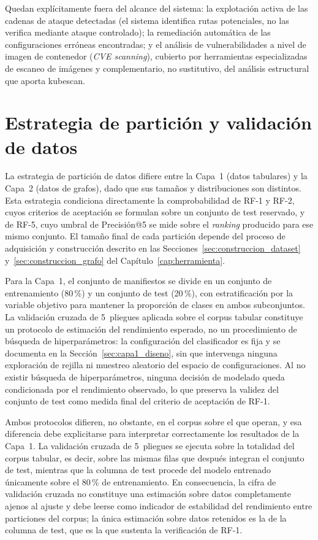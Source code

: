 Quedan explícitamente fuera del alcance del sistema: la explotación activa de las
cadenas de ataque detectadas (el sistema identifica rutas potenciales, no las
verifica mediante ataque controlado); la remediación automática de las
configuraciones erróneas encontradas; y el análisis de vulnerabilidades a nivel de
imagen de contenedor (\textit{CVE scanning}), cubierto por herramientas
especializadas de escaneo de imágenes y complementario, no sustitutivo, del
análisis estructural que aporta kubescan.

\section{Estrategia de partición y validación de datos}
\label{sec:particion}

La estrategia de partición de datos difiere entre la Capa~1 (datos tabulares) y la
Capa~2 (datos de grafos), dado que sus tamaños y distribuciones son distintos. Esta
estrategia condiciona directamente la comprobabilidad de RF-1 y RF-2, cuyos
criterios de aceptación se formulan sobre un conjunto de test reservado, y de
RF-5, cuyo umbral de Precisión@5 se mide sobre el \textit{ranking} producido para
ese mismo conjunto. El tamaño final de cada partición depende del proceso de
adquisición y construcción descrito en las
Secciones~\ref{sec:construccion_dataset} y~\ref{sec:construccion_grafo} del
Capítulo~\ref{cap:herramienta}.

Para la Capa~1, el conjunto de manifiestos se divide en un conjunto de entrenamiento
(80\,\%) y un conjunto de test (20\,\%), con estratificación por la variable objetivo
para mantener la proporción de clases en ambos subconjuntos. La validación cruzada
de 5~pliegues aplicada sobre el corpus tabular constituye un protocolo de
estimación del rendimiento esperado, no un procedimiento de búsqueda de
hiperparámetros: la configuración del clasificador es fija y se documenta en la
Sección~\ref{sec:capa1_diseno}, sin que intervenga ninguna exploración de rejilla
ni muestreo aleatorio del espacio de configuraciones. Al no existir búsqueda de
hiperparámetros, ninguna decisión de modelado queda condicionada por el
rendimiento observado, lo que preserva la validez del conjunto de test como
medida final del criterio de aceptación de RF-1.

Ambos protocolos difieren, no obstante, en el corpus sobre el que operan, y esa
diferencia debe explicitarse para interpretar correctamente los resultados de la
Capa~1. La validación cruzada de 5~pliegues se ejecuta sobre la totalidad del
corpus tabular, es decir, sobre las mismas filas que después integran el conjunto
de test, mientras que la columna de test procede del modelo entrenado únicamente
sobre el 80\,\% de entrenamiento. En consecuencia, la cifra de validación cruzada
no constituye una estimación sobre datos completamente ajenos al ajuste y debe
leerse como indicador de estabilidad del rendimiento entre particiones del
corpus; la única estimación sobre datos retenidos es la de la columna de test,
que es la que sustenta la verificación de RF-1.

